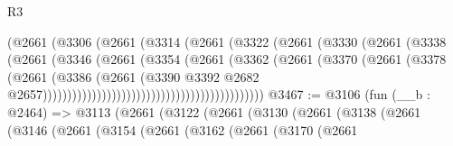 \begin{lexlean}{R3}
\begin{coremodule}
                                              (@2661
                                                (@3306
                                                  (@2661
                                                    (@3314
                                                      (@2661
                                                        (@3322
                                                          (@2661
                                                            (@3330
                                                              (@2661
                                                                (@3338
                                                                  (@2661
                                                                    (@3346
                                                                      (@2661
                                                                        (@3354
                                                                          (@2661
                                                                            (@3362
                                                                              (@2661
                                                                                (@3370
                                                                                  (@2661
                                                                                    (@3378
                                                                                      (@2661
                                                                                        (@3386
                                                                                          (@2661
                                                                                            (@3390
                                                                                              @3392
                                                                                              @2682
                                                                                              @2657)))))))))))))))))))))))))))))))))))))))))))))
@3467 := @3106
    (fun (__b : @2464) =>
    @3113
      (@2661
        (@3122
          (@2661
            (@3130
              (@2661
                (@3138
                  (@2661
                    (@3146
                      (@2661
                        (@3154
                          (@2661
                            (@3162
                              (@2661
                                (@3170
                                  (@2661

\end{coremodule}
\end{lexlean}
